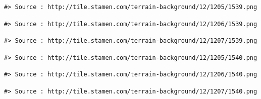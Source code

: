 \documentclass[
  11pt,
]{book}
\begin{document}
\begin{verbatim}
#> Source : http://tile.stamen.com/terrain-background/12/1205/1539.png
\end{verbatim}

\begin{verbatim}
#> Source : http://tile.stamen.com/terrain-background/12/1206/1539.png
\end{verbatim}

\begin{verbatim}
#> Source : http://tile.stamen.com/terrain-background/12/1207/1539.png
\end{verbatim}

\begin{verbatim}
#> Source : http://tile.stamen.com/terrain-background/12/1205/1540.png
\end{verbatim}

\begin{verbatim}
#> Source : http://tile.stamen.com/terrain-background/12/1206/1540.png
\end{verbatim}

\begin{verbatim}
#> Source : http://tile.stamen.com/terrain-background/12/1207/1540.png
\end{verbatim}
\end{document}
